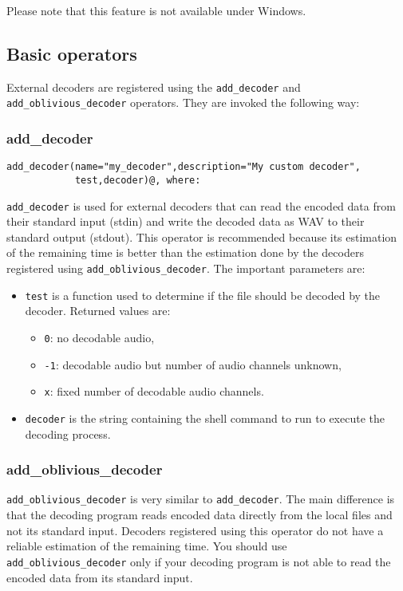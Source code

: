 Please note that this feature is not available under Windows.

\subsection{Basic operators}
External decoders are registered using the \verb+add_decoder+ and \verb+add_oblivious_decoder+ operators. 
They are invoked the following way: 

\subsubsection{add\_decoder}
\begin{verbatim}
add_decoder(name="my_decoder",description="My custom decoder",
            test,decoder)@, where:
\end{verbatim}
\verb+add_decoder+ is used for external decoders that can read the encoded data from their standard
input (stdin) and write the decoded data as WAV to their standard output (stdout). This operator
is recommended because its estimation of the remaining time is better than the estimation done
by the decoders registered using \verb+add_oblivious_decoder+. The important parameters are:

\begin{itemize}
\item \verb+test+ is a function used to determine if the file should be decoded by the decoder. Returned values are: \begin{itemize}
\item \verb+0+: no decodable audio, 
\item \verb+-1+: decodable audio but number of audio channels unknown, 
\item \verb+x+: fixed number of decodable audio channels.

\end{itemize}

\item \verb+decoder+ is the string containing the shell command to run to execute the decoding process.

\end{itemize}

\subsubsection{add\_oblivious\_decoder}
\verb+add_oblivious_decoder+ is very similar to \verb+add_decoder+. The main difference is that the
decoding program reads encoded data directly from the local files and not its standard input.
Decoders registered using this operator do not have a reliable estimation of the remaining
time. You should use \verb+add_oblivious_decoder+ only if your decoding program is not able
to read the encoded data from its standard input.

